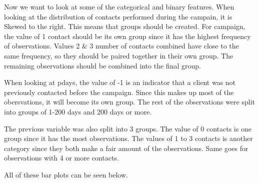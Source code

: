 \documentclass[
]{article}
\newenvironment{Shaded}{\begin{snugshade}}{\end{snugshade}}
\newcommand{\AttributeTok}[1]{\textcolor[rgb]{0.13,0.29,0.53}{#1}}
\newcommand{\CommentTok}[1]{\textcolor[rgb]{0.56,0.35,0.01}{\textit{#1}}}
\newcommand{\DecValTok}[1]{\textcolor[rgb]{0.00,0.00,0.81}{#1}}
\newcommand{\FunctionTok}[1]{\textcolor[rgb]{0.13,0.29,0.53}{\textbf{#1}}}
\newcommand{\NormalTok}[1]{#1}
\newcommand{\OtherTok}[1]{\textcolor[rgb]{0.56,0.35,0.01}{#1}}
\newcommand{\SpecialCharTok}[1]{\textcolor[rgb]{0.81,0.36,0.00}{\textbf{#1}}}
\newcommand{\StringTok}[1]{\textcolor[rgb]{0.31,0.60,0.02}{#1}}
\begin{document}
\begin{Shaded}
\end{Shaded}

Now we want to look at some of the categorical and binary features. When
looking at the distribution of contacts performed during the campain, it
is Skewed to the right. This means that groups should be created. For
campaign, the value of 1 contact should be its own group since it has
the highest frequency of observations. Values 2 \& 3 number of contacts
combined have close to the same frequency, so they should be paired
together in their own group. The remaining observations should be
combined into the final group.

When looking at pdays, the value of -1 is an indicator that a client was
not previously contacted before the campaign. Since this makes up most
of the obersvations, it will become its own group. The rest of the
observations were split into groups of 1-200 days and 200 days or more.

The previous variable was also split into 3 groups. The value of 0
contacts is one group since it has the most observations. The values of
1 to 3 contacts is another category since they both make a fair amount
of the observations. Same goes for observations with 4 or more contacts.

All of these bar plots can be seen below.

\begin{Shaded}
\end{Shaded}
\end{document}
